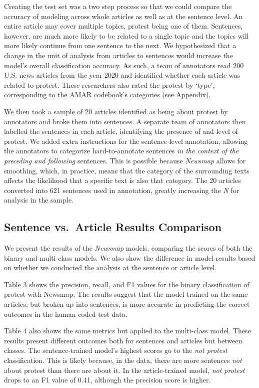 \documentclass[
]{article}
\begin{document}
Creating the test set was a two step process so that we could compare
the accuracy of modeling across whole articles as well as at the
sentence level. An entire article may cover multiple topics, protest
being one of them. Sentences, however, are much more likely to be
related to a single topic and the topics will more likely continue from
one sentence to the next. We hypothesized that a change in the unit of
analysis from articles to sentences would increase the model's overall
classification accuracy. As such, a team of annotators read 200 U.S.
news articles from the year 2020 and identified whether each article was
related to protest. These researchers also rated the protest by `type',
corresponding to the AMAR codebook's categories (see Appendix).

We then took a sample of 20 articles identified as being about protest
by annotators and broke them into sentences. A separate team of
annotators then labelled the sentences in each article, identifying the
presence of and level of protest. We added extra instructions for the
sentence-level annotation, allowing the annotators to categorize
hard-to-annotate sentences \emph{in the context of the preceding and
following} sentences. This is possible because \emph{Newsmap} allows for
smoothing, which, in practice, means that the category of the
surrounding texts affects the likelihood that a specific text is also
that category. The 20 articles converted into 621 sentences used in
annotation, greatly increasing the \emph{N} for analysis in the sample.

\hypertarget{sentence-vs.-article-results-comparison}{%
\subsection{Sentence vs.~Article Results
Comparison}\label{sentence-vs.-article-results-comparison}}

We present the results of the \emph{Newsmap} models, comparing the
scores of both the binary and multi-class models. We also show the
difference in model results based on whether we conducted the analysis
at the sentence or article level.

Table 3 shows the precision, recall, and F1 values for the binary
classification of protest with Newsmap. The results suggest that the
model trained on the same articles, but broken up into sentences, is
more accurate in predicting the correct outcomes in the human-coded test
data.

Table 4 also shows the same metrics but applied to the multi-class
model. These results present different outcomes both for sentences and
articles but between classes. The sentence-trained model's highest
scores go to the \emph{not protest} classification. This is likely
because, in the data, there are more sentences \emph{not} about protest
than there are about it. In the article-trained model, \emph{not
protest} drops to an F1 value of 0.41, although the precision score is
higher.
\end{document}
